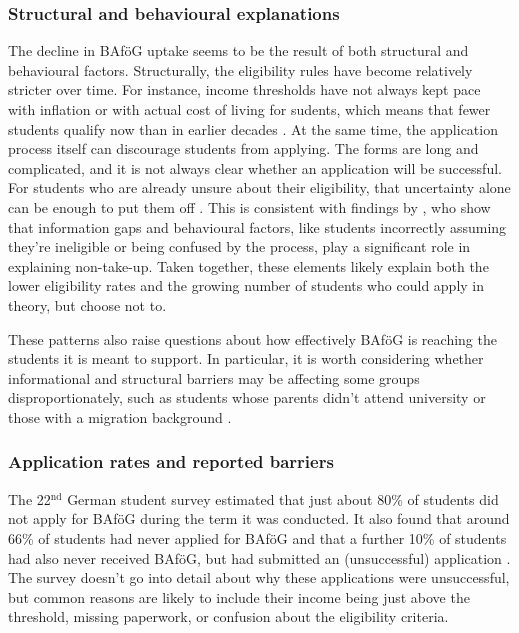 \subsubsection*{Structural and behavioural explanations}
\label{subsection:structural-and-behavioural-explanations}
The decline in BAföG uptake seems to be the result of both structural and behavioural factors. Structurally, the eligibility rules have become relatively stricter over time. For instance, income thresholds have not always kept pace with inflation or with actual cost of living for sudents, which means that fewer students qualify now than in earlier decades \citep{meier_zur_2024}. At the same time, the application process itself can discourage students from applying. The forms are long and complicated, and it is not always clear whether an application will be successful. For students who are already unsure about their eligibility, that uncertainty alone can be enough to put them off \citep{kroher_studierendenbefragung_2023}. This is consistent with findings by \cite{fidan_why_2021}, who show that information gaps and behavioural factors, like students incorrectly assuming they’re ineligible or being confused by the process, play a significant role in explaining non-take-up. Taken together, these elements likely explain both the lower eligibility rates and the growing number of students who could apply in theory, but choose not to.

These patterns also raise questions about how effectively BAföG is reaching the students it is meant to support. In particular, it is worth considering whether informational and structural barriers may be affecting some groups disproportionately, such as students whose parents didn’t attend university or those with a migration background \citep{kroher_studierendenbefragung_2023}.

\subsubsection*{Application rates and reported barriers}
\label{subsection:application-rates-and-reported-barriers}
The 22\( ^\text{nd} \) German student survey estimated that just about 80\% of students did not apply for BAföG during the term it was conducted. It also found that around 66\% of students had never applied for BAföG and that a further 10\% of students had also never received BAföG, but had submitted an (unsuccessful) application \citep{kroher_studierendenbefragung_2023}. The survey doesn’t go into detail about why these applications were unsuccessful, but common reasons are likely to include their income being just above the threshold, missing paperwork, or confusion about the eligibility criteria. 

